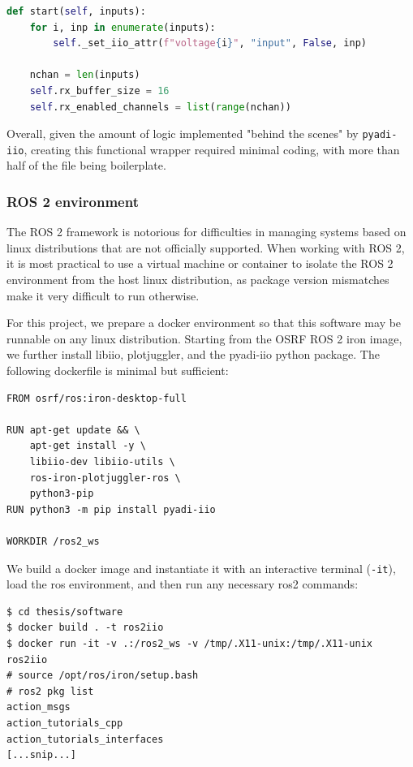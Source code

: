 \documentclass{thesis}
\begin{document}
\begin{lstlisting}[language=Python]
def start(self, inputs):
    for i, inp in enumerate(inputs):
        self._set_iio_attr(f"voltage{i}", "input", False, inp)

    nchan = len(inputs)
    self.rx_buffer_size = 16
    self.rx_enabled_channels = list(range(nchan))
\end{lstlisting}

Overall, given the amount of logic implemented "behind the scenes" by \texttt{pyadi-iio}, creating this functional wrapper required minimal coding, with more than half of the file being boilerplate.

\subsubsection{ROS 2 environment}

The ROS 2 framework is notorious for difficulties in managing systems based on linux distributions that are not officially supported. When working with ROS 2, it is most practical to use a virtual machine or container to isolate the ROS 2 environment from the host linux distribution, as package version mismatches make it very difficult to run otherwise.

For this project, we prepare a docker environment so that this software may be runnable on any linux distribution. Starting from the OSRF ROS 2 iron image, we further install libiio, plotjuggler, and the pyadi-iio python package. The following dockerfile is minimal but sufficient:

\begin{lstlisting}
FROM osrf/ros:iron-desktop-full

RUN apt-get update && \
    apt-get install -y \
    libiio-dev libiio-utils \
    ros-iron-plotjuggler-ros \
    python3-pip
RUN python3 -m pip install pyadi-iio

WORKDIR /ros2_ws
\end{lstlisting}

We build a docker image and instantiate it with an interactive terminal (\texttt{-it}), load the ros environment, and then run any necessary ros2 commands:

\begin{verbatim}
$ cd thesis/software
$ docker build . -t ros2iio
$ docker run -it -v .:/ros2_ws -v /tmp/.X11-unix:/tmp/.X11-unix ros2iio
# source /opt/ros/iron/setup.bash
# ros2 pkg list
action_msgs
action_tutorials_cpp
action_tutorials_interfaces
[...snip...]
\end{verbatim}
\end{document}
